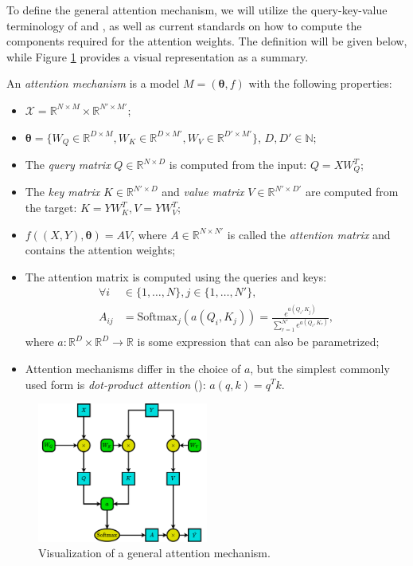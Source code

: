 To define the general attention mechanism, we will utilize the query-key-value terminology of \cite{graves_neural_2014} and \cite{vaswani_attention_2017}, as well as current standards on how to compute the components required for the attention weights. The definition will be given below, while Figure \ref{fig:attention} provides a visual representation as a summary.

\begin{definition}
An \emph{attention mechanism} is a model $M=(\pmb{\theta}, f)$ with the following properties:
\begin{itemize}
\item $\mathcal{X}=\mathbb{R}^{N \times M} \times \mathbb{R}^{N' \times M'}$; 
\item $\pmb{\theta}=\{W_Q \in \mathbb{R}^{D \times M}, W_K \in \mathbb{R}^{D \times M'}, W_V \in \mathbb{R}^{D' \times M'}\}$, $D, D' \in \mathbb{N}$;
\item The \emph{query matrix} $Q \in \mathbb{R}^{N \times D}$ is computed from the input: $Q = X W_Q^T$;
\item The \emph{key matrix} $K \in \mathbb{R}^{N' \times D}$ and \emph{value matrix} $V \in \mathbb{R}^{N' \times D'}$ are computed from the target: $K=Y W_K^T, V=Y W_V^T$;
\item $f((X, Y), \pmb{\theta}) = A V$, where $A \in \mathbb{R}^{N \times N'}$ is called the \emph{attention matrix} and contains the attention weights;
\item The attention matrix is computed using the queries and keys: 
\begin{align}
\forall i &\in \{1,\dots,N\}, j \in \{1,\dots,N'\}, \nonumber \\
A_{ij}&=\text{Softmax}_j(a(Q_i,K_j))=\frac{e^{a(Q_i,K_j)}}{\sum_{r=1}^{N'}{e^{a(Q_i,K_r)}}},
\end{align}
where $a: \mathbb{R}^D \times \mathbb{R}^D \to \mathbb{R}$ is some expression that can also be parametrized;
\item Attention mechanisms differ in the choice of $a$, but the simplest commonly used form is \emph{dot-product attention} (\cite{luong_effective_2015}): $a(q, k)=q^T k$.
\end{itemize}
\end{definition}

\begin{figure}[H]
\centering
\includegraphics[width=0.5\textwidth]{figures/background/attention.pdf}
\caption[Visualization of a general attention mechanism.]{Visualization of a general attention mechanism.}
\label{fig:attention}
\end{figure}

